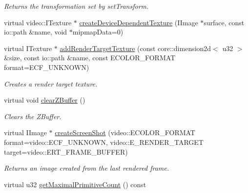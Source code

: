 \begin{DoxyCompactItemize}
\begin{DoxyCompactList}\small\item\em Returns the transformation set by set\-Transform. \end{DoxyCompactList}\item 
virtual video\-::\-I\-Texture $\ast$ \hyperlink{classirr_1_1video_1_1_c_software_driver_af63c3a2bf6c2d392d97e2cd97d4c3209}{create\-Device\-Dependent\-Texture} (I\-Image $\ast$surface, const io\-::path \&name, void $\ast$mipmap\-Data=0)
\item 
\hypertarget{classirr_1_1video_1_1_c_software_driver_a76fa001128953f8436dd2deae8ed4979}{virtual I\-Texture $\ast$ \hyperlink{classirr_1_1video_1_1_c_software_driver_a76fa001128953f8436dd2deae8ed4979}{add\-Render\-Target\-Texture} (const core\-::dimension2d$<$ u32 $>$ \&size, const io\-::path \&name, const E\-C\-O\-L\-O\-R\-\_\-\-F\-O\-R\-M\-A\-T format=E\-C\-F\-\_\-\-U\-N\-K\-N\-O\-W\-N)}\label{classirr_1_1video_1_1_c_software_driver_a76fa001128953f8436dd2deae8ed4979}

\begin{DoxyCompactList}\small\item\em Creates a render target texture. \end{DoxyCompactList}\item 
\hypertarget{classirr_1_1video_1_1_c_software_driver_af7753ce2c17f7c7cbbc463dc97c0dc83}{virtual void \hyperlink{classirr_1_1video_1_1_c_software_driver_af7753ce2c17f7c7cbbc463dc97c0dc83}{clear\-Z\-Buffer} ()}\label{classirr_1_1video_1_1_c_software_driver_af7753ce2c17f7c7cbbc463dc97c0dc83}

\begin{DoxyCompactList}\small\item\em Clears the Z\-Buffer. \end{DoxyCompactList}\item 
\hypertarget{classirr_1_1video_1_1_c_software_driver_a72a4065ac301ee42b9d62aed8be59419}{virtual I\-Image $\ast$ \hyperlink{classirr_1_1video_1_1_c_software_driver_a72a4065ac301ee42b9d62aed8be59419}{create\-Screen\-Shot} (video\-::\-E\-C\-O\-L\-O\-R\-\_\-\-F\-O\-R\-M\-A\-T format=video\-::\-E\-C\-F\-\_\-\-U\-N\-K\-N\-O\-W\-N, video\-::\-E\-\_\-\-R\-E\-N\-D\-E\-R\-\_\-\-T\-A\-R\-G\-E\-T target=video\-::\-E\-R\-T\-\_\-\-F\-R\-A\-M\-E\-\_\-\-B\-U\-F\-F\-E\-R)}\label{classirr_1_1video_1_1_c_software_driver_a72a4065ac301ee42b9d62aed8be59419}

\begin{DoxyCompactList}\small\item\em Returns an image created from the last rendered frame. \end{DoxyCompactList}\item 
virtual u32 \hyperlink{classirr_1_1video_1_1_c_software_driver_aa8c493318e46699bac981e74b2366602}{get\-Maximal\-Primitive\-Count} () const 
\end{DoxyCompactItemize}
